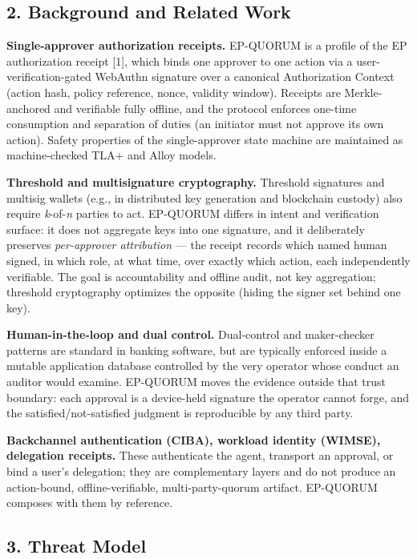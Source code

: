 \documentclass[
  11pt,
]{article}
\begin{document}
\subsection{2. Background and Related
Work}\label{background-and-related-work}

\textbf{Single-approver authorization receipts.} EP-QUORUM is a profile
of the EP authorization receipt {[}1{]}, which binds one approver to one
action via a user-verification-gated WebAuthn signature over a canonical
Authorization Context (action hash, policy reference, nonce, validity
window). Receipts are Merkle-anchored and verifiable fully offline, and
the protocol enforces one-time consumption and separation of duties (an
initiator must not approve its own action). Safety properties of the
single-approver state machine are maintained as machine-checked TLA+ and
Alloy models.

\textbf{Threshold and multisignature cryptography.} Threshold signatures
and multisig wallets (e.g., in distributed key generation and blockchain
custody) also require \emph{k}-of-\emph{n} parties to act. EP-QUORUM
differs in intent and verification surface: it does not aggregate keys
into one signature, and it deliberately preserves \emph{per-approver
attribution} --- the receipt records which named human signed, in which
role, at what time, over exactly which action, each independently
verifiable. The goal is accountability and offline audit, not key
aggregation; threshold cryptography optimizes the opposite (hiding the
signer set behind one key).

\textbf{Human-in-the-loop and dual control.} Dual-control and
maker-checker patterns are standard in banking software, but are
typically enforced inside a mutable application database controlled by
the very operator whose conduct an auditor would examine. EP-QUORUM
moves the evidence outside that trust boundary: each approval is a
device-held signature the operator cannot forge, and the
satisfied/not-satisfied judgment is reproducible by any third party.

\textbf{Backchannel authentication (CIBA), workload identity (WIMSE),
delegation receipts.} These authenticate the agent, transport an
approval, or bind a user's delegation; they are complementary layers and
do not produce an action-bound, offline-verifiable, multi-party-quorum
artifact. EP-QUORUM composes with them by reference.

\subsection{3. Threat Model}\label{threat-model}
\end{document}
